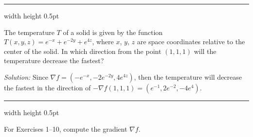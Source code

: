 \vspace{3mm}
\hrule width \textwidth height 0.5pt
\begin{exmp}
 The temperature $T$ of a solid is given by the function $T(x,y,z) = e^{-x} + e^{-2y} + e^{4z}$, where
 $x$, $y$, $z$ are space coordinates relative to the center of the solid. In which direction from the point $(1,1,1)$
 will the temperature decrease the fastest?\vspace{1mm}
 \par\noindent\emph{Solution:} Since $\nabla f = (-e^{-x},-2e^{-2y},4e^{4z})$, then the temperature will decrease the
 fastest in the direction of
 $-\nabla f(1,1,1) = (e^{-1},2e^{-2},-4e^4 )$.
\end{exmp}
\hrule width \textwidth height 0.5pt
\newpage
\centerline{}\label{sec2dot4}
\par\noindent For Exercises 1--10, compute the gradient $\nabla f$.
